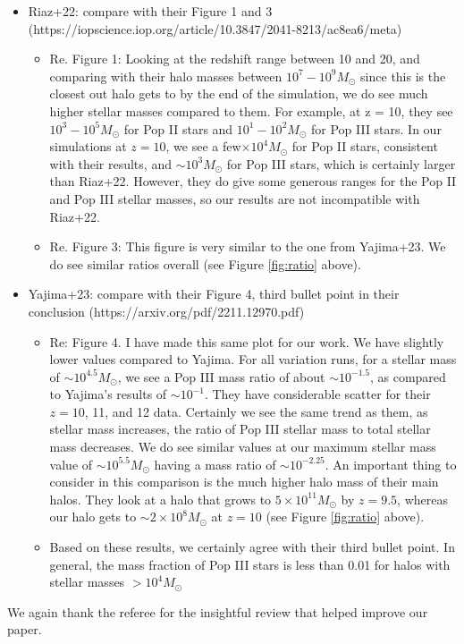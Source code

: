 \documentclass[11pt]{article}
\begin{document}
\begin{itemize}
    \item Riaz+22: compare with their Figure 1 and 3 (https://iopscience.iop.org/article/10.3847/2041-8213/ac8ea6/meta)
    \begin{itemize}
        \item Re. Figure 1: Looking at the redshift range between 10 and 20, and comparing with their halo masses between $10^7 - 10^9 M_\odot$ since this is the closest out halo gets to by the end of the simulation, we do see much higher stellar masses compared to them. For example, at z = 10, they see $10^3 - 10^5 M_\odot$ for Pop II stars and $10^1 - 10^2 M_\odot$ for Pop III stars. In our simulations at $z = 10$, we see a few$\times 10^4 M_\odot$ for Pop II stars, consistent with their results, and $\sim10^{3} M_{\odot}$ for Pop III stars, which is certainly larger than Riaz+22. However, they do give some generous ranges for the Pop II and Pop III stellar masses, so our results are not incompatible with Riaz+22.
        \item Re. Figure 3: This figure is very similar to the one from Yajima+23. We do see similar ratios overall (see Figure \ref{fig:ratio} above).
    \end{itemize}
    \item Yajima+23: compare with their Figure 4, third bullet point in their conclusion (https://arxiv.org/pdf/2211.12970.pdf)
    \begin{itemize}
        \item Re: Figure 4. I have made this same plot for our work. We have slightly lower values compared to Yajima. For all variation runs, for a stellar mass of $\sim10^{4.5} M_\odot$, we see a Pop III mass ratio of about $\sim10^{-1.5}$, as compared to Yajima's results of $\sim10^{-1}$. They have considerable scatter for their $z = 10$, 11, and 12 data. Certainly we see the same trend as them, as stellar mass increases, the ratio of Pop III stellar mass to total stellar mass decreases. We do see similar values at our maximum stellar mass value of $\sim10^{5.5} M_\odot$ having a mass ratio of $\sim10^{-2.25}$. An important thing to consider in this comparison is the much higher halo mass of their main halos. They look at a halo that grows to $5 \times 10^{11} M_\odot$ by $z = 9.5$, whereas our halo gets to $\sim2 \times 10^{8} M_\odot$ at $z = 10$ (see Figure \ref{fig:ratio} above).
        \item Based on these results, we certainly agree with their third bullet point. In general, the mass fraction of Pop III stars is less than 0.01 for halos with stellar masses $> 10^{4} M_\odot$ 
    \end{itemize}
\end{itemize}

We again thank the referee for the insightful review that helped
improve our paper.



\end{document}
